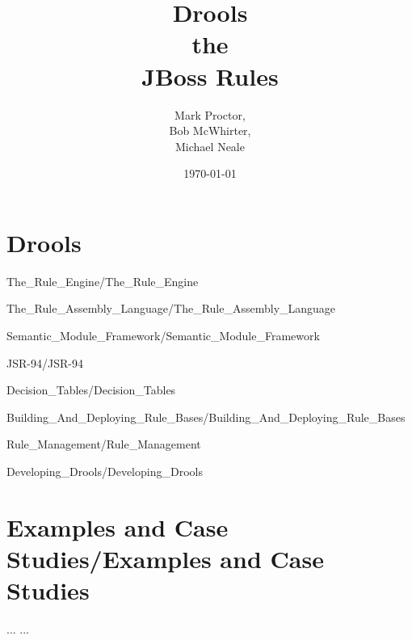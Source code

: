 \documentclass[14pt]{book}
\begin{document}
\title{\Huge\bf Drools\\ the\\ JBoss Rules}
\author{Mark Proctor,\\ 
       Bob McWhirter,\\ 
       Michael Neale}
\date{\today}
\maketitle

\tableofcontents

\part {Drools}

 {The_Rule_Engine/The_Rule_Engine}

 {The_Rule_Assembly_Language/The_Rule_Assembly_Language}

 {Semantic_Module_Framework/Semantic_Module_Framework}

 {JSR-94/JSR-94}

 {Decision_Tables/Decision_Tables}

 {Building_And_Deploying_Rule_Bases/Building_And_Deploying_Rule_Bases}

 {Rule_Management/Rule_Management}

 {Developing_Drools/Developing_Drools}

\part {Examples and Case Studies/Examples and Case Studies}

\begin{thebibliography}{99}
 ...
 ...
\end{thebibliography}

\printindex
\end{document}
